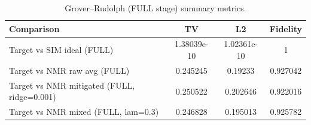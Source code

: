 \begin{table}[t]
\centering
\small
\begin{tabular}{lccc}
\hline
Comparison & TV & L2 & Fidelity \\
\hline
Target vs SIM ideal (FULL) & 1.38039e-10 & 1.02361e-10 & 1 \\
Target vs NMR raw avg (FULL) & 0.245245 & 0.19233 & 0.927042 \\
Target vs NMR mitigated (FULL, ridge=0.001) & 0.250522 & 0.202646 & 0.922016 \\
Target vs NMR mixed (FULL, lam=0.3) & 0.246828 & 0.195013 & 0.925782 \\
\hline
\end{tabular}
\caption{Grover–Rudolph (FULL stage) summary metrics.}
\label{tab:gr\_full\_summary}
\end{table}
